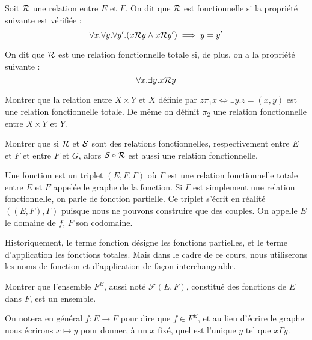 \begin{defi}
    Soit $\mathcal R$ une relation entre $E$ et $F$. On dit que $\mathcal R$ est fonctionnelle si la propriété suivante est vérifiée : $$\forall x.\forall y. \forall y'. (x\mathcal R y\land x\mathcal R y')\implies y=y'$$

    On dit que $\mathcal R$ est une relation fonctionnelle totale si, de plus, on a la propriété suivante : $$\forall x.\exists y. x\mathcal R y$$
\end{defi}

\begin{exo}
    Montrer que la relation entre $X\times Y$ et $X$ définie par $z\pi_1 x\iff \exists y. z=(x,y)$ est une relation fonctionnelle totale. De même on définit $\pi_2$ une relation fonctionnelle entre $X\times Y$ et $Y$.
\end{exo}

\begin{exo}
    Montrer que si $\mathcal R$ et $\mathcal S$ sont des relations fonctionnelles, respectivement entre $E$ et $F$ et entre $F$ et $G$, alors $\mathcal S\circ \mathcal R$ est aussi une relation fonctionnelle.
\end{exo}

\begin{defi}[Fonction]
    Une fonction est un triplet $(E,F,\Gamma)$ où $\Gamma$ est une relation fonctionnelle totale entre $E$ et $F$ appelée le graphe de la fonction. Si $\Gamma$ est simplement une relation fonctionnelle, on parle de fonction partielle. Ce triplet s'écrit en réalité $((E,F),\Gamma)$ puisque nous ne pouvons construire que des couples. On appelle $E$ le domaine de $f$, $F$ son codomaine.
\end{defi}

\begin{rmk}
    Historiquement, le terme fonction désigne les fonctions partielles, et le terme d'application les fonctions totales. Mais dans le cadre de ce cours, nous utiliserons les noms de fonction et d'application de façon interchangeable.
\end{rmk}

\begin{exo}
    Montrer que l'ensemble $F^E$, aussi noté $\mathcal F(E,F)$, constitué des fonctions de $E$ dans $F$, est un ensemble.
\end{exo}

On notera en général $f : E \to F$ pour dire que $f\in F^E$, et au lieu d'écrire le graphe nous écrirons $x\mapsto y$ pour donner, à un $x$ fixé, quel est l'unique $y$ tel que $x\Gamma y$.

